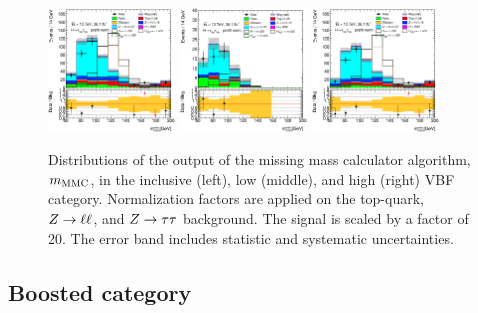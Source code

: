 \begin{figure}[htb]
    \centering
    \includegraphics[width=0.3\textwidth]{./plots/event_selection/ll-CutVBFCat-dilep_mmc_mlm_m_vbf-lin.eps}
    \includegraphics[width=0.3\textwidth]{./plots/event_selection/ll-CutVBFCatA-dilep_mmc_mlm_m_vbf-lin.eps}
    \includegraphics[width=0.3\textwidth]{./plots/event_selection/ll-CutVBFCatB-dilep_mmc_mlm_m_vbf-lin.eps}
    \caption{Distributions of the output of the missing mass calculator algorithm, $m_\text{MMC}$, in the inclusive (left),
             low (middle), and high (right) VBF category.
             Normalization factors are applied on the top-quark, $Z \to \ell \ell$, and $Z \to \tau \tau$ background.
             The signal is scaled by a factor of 20.
             The error band includes statistic and systematic uncertainties.}\label{fig:event_selection:vbf:mmc}
\end{figure}

\subsection{Boosted category}\label{sub:event_selection:boosted}

